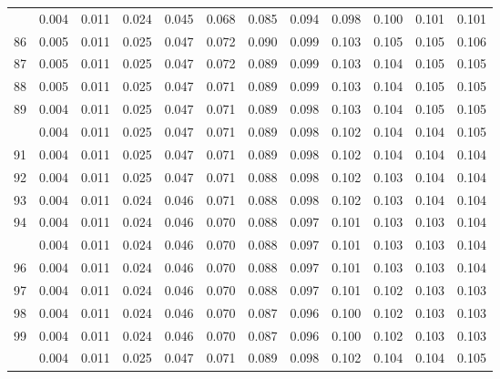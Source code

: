\documentclass[
]{article}
\begin{document}
\begin{longtable}[t]{lrrrrrrrrrrr}
\addlinespace
85 & 0.004 & 0.011 & 0.024 & 0.045 & 0.068 & 0.085 & 0.094 & 0.098 & 0.100 & 0.101 & 0.101\\
86 & 0.005 & 0.011 & 0.025 & 0.047 & 0.072 & 0.090 & 0.099 & 0.103 & 0.105 & 0.105 & 0.106\\
87 & 0.005 & 0.011 & 0.025 & 0.047 & 0.072 & 0.089 & 0.099 & 0.103 & 0.104 & 0.105 & 0.105\\
88 & 0.005 & 0.011 & 0.025 & 0.047 & 0.071 & 0.089 & 0.099 & 0.103 & 0.104 & 0.105 & 0.105\\
89 & 0.004 & 0.011 & 0.025 & 0.047 & 0.071 & 0.089 & 0.098 & 0.103 & 0.104 & 0.105 & 0.105\\
\addlinespace
90 & 0.004 & 0.011 & 0.025 & 0.047 & 0.071 & 0.089 & 0.098 & 0.102 & 0.104 & 0.104 & 0.105\\
91 & 0.004 & 0.011 & 0.025 & 0.047 & 0.071 & 0.089 & 0.098 & 0.102 & 0.104 & 0.104 & 0.104\\
92 & 0.004 & 0.011 & 0.025 & 0.047 & 0.071 & 0.088 & 0.098 & 0.102 & 0.103 & 0.104 & 0.104\\
93 & 0.004 & 0.011 & 0.024 & 0.046 & 0.071 & 0.088 & 0.098 & 0.102 & 0.103 & 0.104 & 0.104\\
94 & 0.004 & 0.011 & 0.024 & 0.046 & 0.070 & 0.088 & 0.097 & 0.101 & 0.103 & 0.103 & 0.104\\
\addlinespace
95 & 0.004 & 0.011 & 0.024 & 0.046 & 0.070 & 0.088 & 0.097 & 0.101 & 0.103 & 0.103 & 0.104\\
96 & 0.004 & 0.011 & 0.024 & 0.046 & 0.070 & 0.088 & 0.097 & 0.101 & 0.103 & 0.103 & 0.104\\
97 & 0.004 & 0.011 & 0.024 & 0.046 & 0.070 & 0.088 & 0.097 & 0.101 & 0.102 & 0.103 & 0.103\\
98 & 0.004 & 0.011 & 0.024 & 0.046 & 0.070 & 0.087 & 0.096 & 0.100 & 0.102 & 0.103 & 0.103\\
99 & 0.004 & 0.011 & 0.024 & 0.046 & 0.070 & 0.087 & 0.096 & 0.100 & 0.102 & 0.103 & 0.103\\
\addlinespace
100 & 0.004 & 0.011 & 0.025 & 0.047 & 0.071 & 0.089 & 0.098 & 0.102 & 0.104 & 0.104 & 0.105\\*
\end{longtable}
\end{document}
